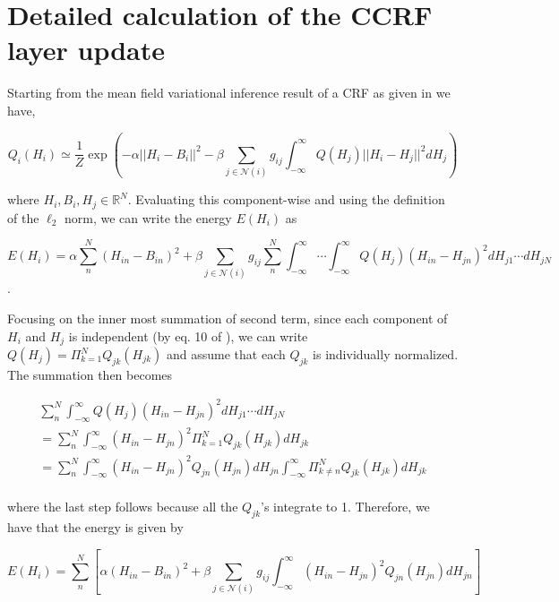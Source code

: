



\section{Detailed calculation of the CCRF layer update}
Starting from the mean field variational inference result of a CRF as given in  we have,

\begin{equation}
Q_i (H_i) \simeq \frac{1}{Z} \exp \left ( - \alpha || H_i - B_i ||^2  - \beta \sum_{j \in \mathcal{N}(i)} g_{ij} \int_{-\infty}^{\infty} Q(H_j) ||H_i - H_j ||^2 d H_j\right )
\end{equation}

where $H_i, B_i, H_j \in \mathbb{R}^N$. Evaluating this component-wise and using the definition of the $\ell_2$ norm, we can write the energy $E(H_i)$ as

\begin{equation}
E(H_i) = \alpha \sum_n^N (H_{in} - B_{in})^2 + \beta \sum_{j \in \mathcal{N}(i)} g_{ij} \sum_n^N \int_{-\infty}^{\infty} \cdots \int_{-\infty}^{\infty} Q(H_j) (H_{in} - H_{jn})^2 d H_{j1}\cdots dH_{jN}
\end{equation}.

Focusing on the inner most summation of second term, since each component of $H_i$ and $H_j$ is independent (by eq. 10 of ), we can write $Q(H_j) = \Pi_{k=1}^N Q_{jk}(H_{jk})$ and assume that each $Q_{jk}$ is individually normalized. The summation then becomes

\begin{multline}
 \sum_n^N \int_{-\infty}^{\infty}  Q(H_j) (H_{in} - H_{jn})^2 d H_{j1}\cdots dH_{jN} \\
= \sum_n^N \int_{-\infty}^{\infty} (H_{in} - H_{jn})^2  \Pi_{k=1}^N Q_{jk}(H_{jk}) d H_{jk} \\
= \sum_n^N \int_{-\infty}^{\infty} (H_{in} - H_{jn})^2  Q_{jn}(H_{jn}) d H_{jn}\int_{-\infty}^{\infty}  \Pi_{k\neq n}^N Q_{jk}(H_{jk}) d H_{jk} \\
\end{multline} 

where the last step follows because all the $Q_{jk}$'s integrate to 1. Therefore, we have that the energy is given by

\begin{equation}
E(H_i) = \sum_n^N \left [ \alpha (H_{in} - B_{in})^2 + \beta \sum_{j \in \mathcal{N}(i)} g_{ij}  \int_{-\infty}^{\infty} (H_{in} - H_{jn})^2  Q_{jn}(H_{jn}) d H_{jn} \right ]
\end{equation}


